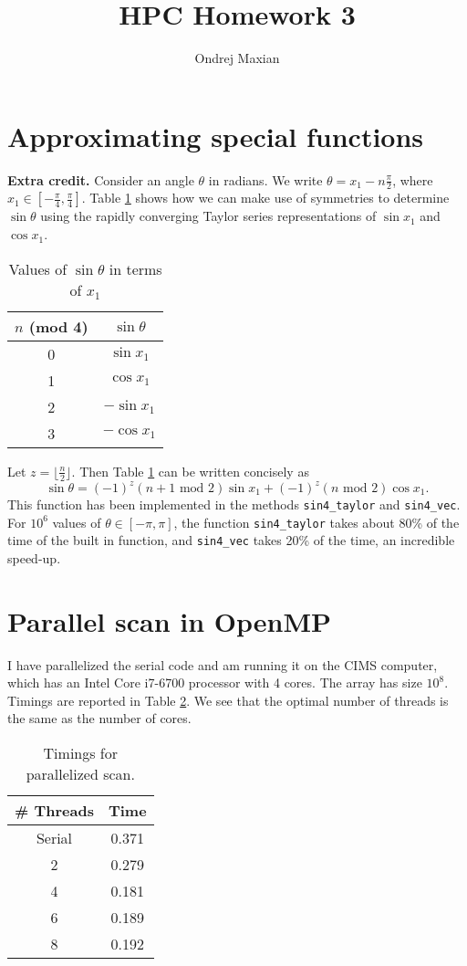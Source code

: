 \documentclass[a4paper]{article}
\title{HPC Homework 3}
\author{Ondrej Maxian}
\begin{document}
\maketitle

\section{Approximating special functions}
\textbf{Extra credit.} Consider an angle $\theta$ in radians. We write $\displaystyle \theta = x_1 - n\frac{\pi}{2}$, where $\displaystyle x_1 \in \left[-\frac{\pi}{4},\frac{\pi}{4}\right]$. Table \ref{tab:sintrick} shows how we can make use of symmetries to determine $\sin{\theta}$ using the rapidly converging Taylor series representations of $\sin{x_1}$ and $\cos{x_1}$. 

\begin{table}[ht]
\centering
\begin{tabular}{c|c}
$n$ (mod 4) & $\sin{\theta}$\\[2 pt] \hline
0 & $\sin{x_1}$ \\[2 pt]
1 & $\cos{x_1}$\\[2 pt]
2 & $-\sin{x_1}$\\[2 pt]
3 & $-\cos{x_1}$ 
\end{tabular}
\caption{Values of $\sin{\theta}$ in terms of $x_1$}
\label{tab:sintrick}
\end{table}

Let $z = \lfloor{\frac{n}{2}}\rfloor$. Then Table \ref{tab:sintrick} can be written concisely as
\begin{equation}
\sin{\theta} = (-1)^z (n+1 \textrm{ mod } 2)\sin{x_1} + (-1)^z  (n \textrm{ mod } 2)\cos{x_1}. 
\end{equation}
This function has been implemented in the methods \texttt{sin4\_taylor} and \texttt{sin4\_vec}. For $10^6$ values of $\theta \in [-\pi,\pi]$, the function \texttt{sin4\_taylor} takes about 80\% of the time of the built in function, and \texttt{sin4\_vec} takes 20\% of the time, an incredible speed-up. 

\section{Parallel scan in OpenMP}
I have parallelized the serial code and am running it on the CIMS computer, which has an Intel Core i7-6700 processor with 4 cores. The array has size $10^8$. Timings are reported in Table \ref{tab:omptime}. We see that the optimal number of threads is the same as the number of cores. 

\begin{table}[ht]
\centering
\begin{tabular}{c|c}
\# Threads & Time\\[2 pt] \hline
Serial & 0.371 \\[2 pt]
2 & 0.279 \\[2 pt]
4 & 0.181\\[2 pt]
6 & 0.189\\[2 pt]
8 & 0.192 
\end{tabular}
\caption{Timings for parallelized scan.}
\label{tab:omptime}
\end{table}
\end{document}
